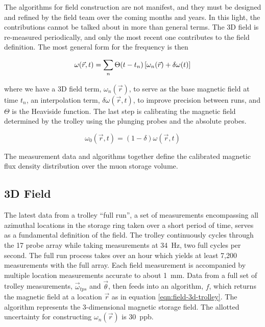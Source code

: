 The algorithms for field construction are not manifest, and they must be designed and refined by the field team over the coming months and years.  In this light, the contributions cannot be talked about in more than general terms.  The 3D field is re-measured periodically, and only the most recent one contributes to the field definition. The most general form for the frequency is then

\begin{equation}
\label{eqn:field-construction}
\omega(\vec{r}, t) = \sum_n \Theta(t - t_n) \\
\left[\omega_{n}(\vec{r}) + \delta \omega(t) \right]
\end{equation}

\noindent
where we have a 3D field term, $\omega_{n}(\vec{r})$, to serve as the base magnetic field at time $t_n$, an interpolation term, $\delta \omega(\vec{r}, t)$, to improve precision between runs, and $\Theta$ is the Heaviside function. The last step is calibrating the magnetic field determined by the trolley using the plunging probes and the absolute probes.

\begin{equation}
\label{eqn:field-calibration}
\omega_0(\vec{r}, t) = (1 - \delta) \omega(\vec{r}, t)
\end{equation}

\noindent The measurement data and algorithms together define the calibrated magnetic flux density distribution over the muon storage volume.

\subsection{3D Field}

The latest data from a trolley ``full run'', a set of measurements encompassing all azimuthal locations in the storage ring taken over a short period of time, serves as a fundamental definition of the field.  The trolley continuously cycles through the 17 probe array while taking measurements at \SI{34}{\Hz}, two full cycles per second.  The full run process takes over an hour which yields at least 7,200 measurements with the full array. Each field measurement is accompanied by multiple location measurements accurate to about \SI{1}{\mm}.  Data from a full set of trolley measurements, $\vec{\omega}_{tps}$ and $\vec{\theta}$, then feeds into an algorithm, $f$, which returns the magnetic field at a location $\vec{r}$ as in equation \ref{eqn:field-3d-trolley}.  The algorithm represents the 3-dimensional magnetic storage field.  The allotted uncertainty for constructing $\omega_{n}(\vec{r})$ is \SI{30}{ppb}.

